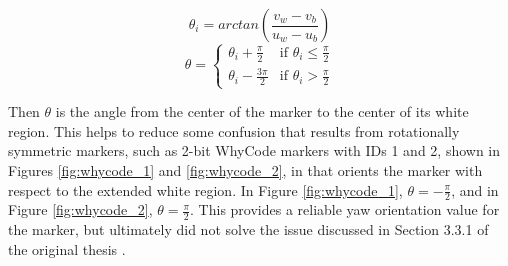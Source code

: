 $$\theta_i = arctan\left(\frac{v_w - v_b}{u_w - u_b}\right)$$
$$\theta = \begin{cases}
    \theta_i + \frac{\pi}{2} &\mbox{if } \theta_i \leq \frac{\pi}{2} \\
    \theta_i - \frac{3\pi}{2} &\mbox{if } \theta_i > \frac{\pi}{2}
\end{cases}$$

Then $\theta$ is the angle from the center of the marker to the center of its white region. This helps to reduce some confusion that results from rotationally symmetric markers, such as 2-bit WhyCode markers with IDs 1 and 2, shown in Figures \ref{fig:whycode_1} and \ref{fig:whycode_2}, in that orients the marker with respect to the extended white region. In Figure \ref{fig:whycode_1}, $\theta = -\frac{\pi}{2}$, and in Figure \ref{fig:whycode_2}, $\theta = \frac{\pi}{2}$. This provides a reliable yaw orientation value for the marker, but ultimately did not solve the issue discussed in Section 3.3.1 of the original thesis \cite{AL_thesis}. 

